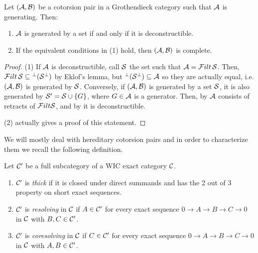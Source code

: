 \begin{lem}\label{lem1_2} Let $(\mathcal{A},\mathcal{B})$ be a cotorsion pair in a Grothendieck category such that $\mathcal{A}$ is generating. Then:
  \begin{enumerate}
    \item $\mathcal{A}$ is generated by a set if and only if it is deconstructible.
    \item If the equivalent conditions in (1) hold, then $(\mathcal{A},\mathcal{B})$ is complete.
  \end{enumerate}
\end{lem}

\begin{proof}
  (1) If $\mathcal{A}$ is deconstructible, call $\mathcal{S}$ the set such that $\mathcal{A} = \mathcal{F} ilt\,\mathcal{S}$. Then, $\mathcal{F} ilt\,\mathcal{S} \subseteq {^\perp(\mathcal{S}^\perp)}$ by Eklof's lemma, but ${^\perp(\mathcal{S}^\perp)}\subseteq\mathcal{A}$ so they are actually equal, i.e. $(\mathcal{A},\mathcal{B})$ is generated by $\mathcal{S}$.
  Conversely, if $(\mathcal{A},\mathcal{B})$ is generated by a set $\mathcal{S}$, it is also generated by $\mathcal{S}'=\mathcal{S}\cup\{G\}$, where $G\in\mathcal{A}$ is a generator. Then, by \cite[Theorem~5.16]{Sto13} $\mathcal{A}$ consists of retracts of $\mathcal{F} ilt \mathcal{S}$, and by \cite[Proposition~2.9(1)]{St10-deconstr} it is deconstructible.

  (2) \cite[Theorem~5.16]{Sto13} actually gives a proof of this statement.
\end{proof}

%


We will mostly deal with  hereditary cotorsion pairs and
in order to characterize them we recall the following definition.
\begin{defn}\label{D:thick} Let $\mathcal{C}'$ be  a full subcategory of a WIC exact category $\mathcal{C}$.
\begin{enumerate}
\item $\mathcal{C}'$ is \emph{thick} if it is closed under direct summands and has the 2 out of 3 property on short exact sequences.
\item $\mathcal{C}'$ is \emph{resolving} in $\mathcal{C}$ if $A\in \mathcal{C}'$ for every exact sequence $0\to A\to B\to C\to 0$ in $\mathcal{C}$ with $B, C\in \mathcal{C}'$.
\item $\mathcal{C}'$ is \emph{coresolving} in $\mathcal{C}$ if $C\in \mathcal{C}'$ for every exact sequence $0\to A\to B\to C\to 0$ in $\mathcal{C}$ with $A, B\in \mathcal{C}'$.
\end{enumerate}
\end{defn}

